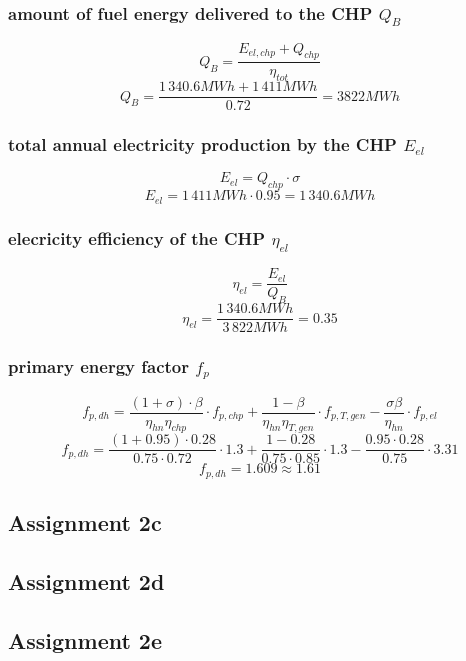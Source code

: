 \documentclass{article}
\begin{document}
		\subsubsection*{amount of fuel energy delivered to the CHP $Q_B$}
			$$Q_B=\frac{E_{el,chp}+Q_{chp}}{\eta_{tot}}$$
			$$Q_B=\frac{1\,340.6MWh+1\,411MWh}{0.72}=3822MWh$$
		\subsubsection*{total annual electricity production by the CHP $E_{el}$}
			$$E_{el}=Q_{chp}\cdot \sigma$$
			$$E_{el}=1\,411MWh\cdot 0.95 = 1\,340.6MWh$$
		\subsubsection*{elecricity efficiency of the CHP $\eta_{el}$}
			$$\eta_{el}=\frac{E_{el}}{Q_B}$$
			$$\eta_{el}=\frac{1\,340.6MWh}{3\,822MWh}=0.35$$
		\subsubsection*{primary energy factor $f_p$}
			$$f_{p,dh}=\frac{(1+\sigma)\cdot\beta}{\eta_{hn}\eta_{chp}}\cdot f_{p,chp}+\frac{1-\beta}{\eta_{hn}\eta_{T,gen}}\cdot f_{p,T,gen}-\frac{\sigma\beta}{\eta_{hn}}\cdot f_{p,el}$$
			$$f_{p,dh}=\frac{(1+0.95)\cdot 0.28}{0.75\cdot 0.72}\cdot 1.3+\frac{1-0.28}{0.75\cdot 0.85}\cdot 1.3-\frac{0.95\cdot 0.28}{0.75}\cdot 3.31$$
			$$f_{p,dh}=1.609\approx 1.61$$
	\subsection*{Assignment 2c}

	\subsection*{Assignment 2d}

	\subsection*{Assignment 2e}
\end{document}

